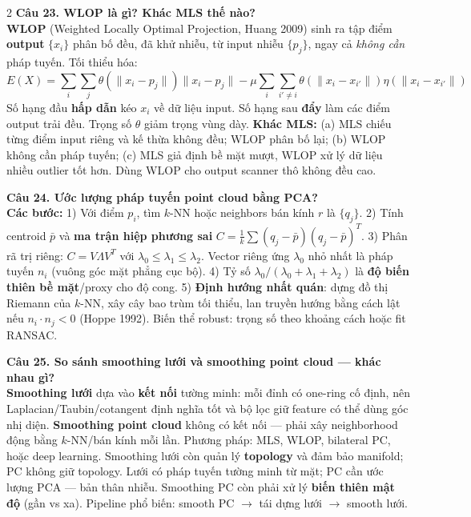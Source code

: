 \begin{paracol}{2}
\textbf{Câu 23. WLOP là gì? Khác MLS thế nào?}\\
\textbf{WLOP} (Weighted Locally Optimal Projection, Huang 2009) sinh ra tập điểm \textbf{output} $\{x_i\}$ phân bố đều, đã khử nhiễu, từ input nhiễu $\{p_j\}$, ngay cả \textit{không cần} pháp tuyến. Tối thiểu hóa:
\[
E(X)=\sum_i\sum_j\theta(\|x_i-p_j\|)\|x_i-p_j\|-\mu\sum_i\sum_{i'\neq i}\theta(\|x_i-x_{i'}\|)\eta(\|x_i-x_{i'}\|)
\]
Số hạng đầu \textbf{hấp dẫn} kéo $x_i$ về dữ liệu input. Số hạng sau \textbf{đẩy} làm các điểm output trải đều. Trọng số $\theta$ giảm trọng vùng dày. \textbf{Khác MLS:} (a) MLS chiếu từng điểm input riêng và kế thừa không đều; WLOP phân bố lại; (b) WLOP không cần pháp tuyến; (c) MLS giả định bề mặt mượt, WLOP xử lý dữ liệu nhiều outlier tốt hơn. Dùng WLOP cho output scanner thô không đều cao.

\textbf{Câu 24. Ước lượng pháp tuyến point cloud bằng PCA?}\\
\textbf{Các bước:} 1) Với điểm $p_i$, tìm $k$-NN hoặc neighbors bán kính $r$ là $\{q_j\}$. 2) Tính centroid $\bar p$ và \textbf{ma trận hiệp phương sai} $C=\tfrac{1}{k}\sum(q_j-\bar p)(q_j-\bar p)^T$. 3) Phân rã trị riêng: $C=V\Lambda V^T$ với $\lambda_0\le\lambda_1\le\lambda_2$. Vector riêng ứng $\lambda_0$ nhỏ nhất là pháp tuyến $n_i$ (vuông góc mặt phẳng cục bộ). 4) Tỷ số $\lambda_0/(\lambda_0+\lambda_1+\lambda_2)$ là \textbf{độ biến thiên bề mặt}/proxy cho độ cong. 5) \textbf{Định hướng nhất quán}: dựng đồ thị Riemann của $k$-NN, xây cây bao trùm tối thiểu, lan truyền hướng bằng cách lật nếu $n_i\cdot n_j<0$ (Hoppe 1992). Biến thể robust: trọng số theo khoảng cách hoặc fit RANSAC.

\textbf{Câu 25. So sánh smoothing lưới và smoothing point cloud — khác nhau gì?}\\
\textbf{Smoothing lưới} dựa vào \textbf{kết nối} tường minh: mỗi đỉnh có one-ring cố định, nên Laplacian/Taubin/cotangent định nghĩa tốt và bộ lọc giữ feature có thể dùng góc nhị diện. \textbf{Smoothing point cloud} không có kết nối — phải xây neighborhood động bằng $k$-NN/bán kính mỗi lần. Phương pháp: MLS, WLOP, bilateral PC, hoặc deep learning. Smoothing lưới còn quản lý \textbf{topology} và đảm bảo manifold; PC không giữ topology. Lưới có pháp tuyến tường minh từ mặt; PC cần ước lượng PCA — bản thân nhiễu. Smoothing PC còn phải xử lý \textbf{biến thiên mật độ} (gần vs xa). Pipeline phổ biến: smooth PC $\to$ tái dựng lưới $\to$ smooth lưới.


\end{paracol}
